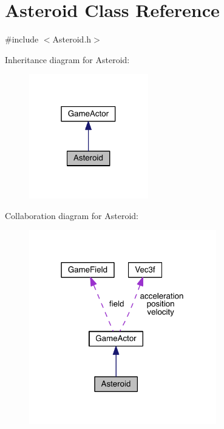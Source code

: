 \hypertarget{class_asteroid}{\section{Asteroid Class Reference}
\label{class_asteroid}
}


{\ttfamily \#include $<$Asteroid.\+h$>$}



Inheritance diagram for Asteroid\+:\nopagebreak
\begin{figure}[H]
\begin{center}
\leavevmode
\includegraphics[width=147pt]{class_asteroid__inherit__graph}
\end{center}
\end{figure}


Collaboration diagram for Asteroid\+:\nopagebreak
\begin{figure}[H]
\begin{center}
\leavevmode
\includegraphics[width=231pt]{class_asteroid__coll__graph}
\end{center}
\end{figure}
